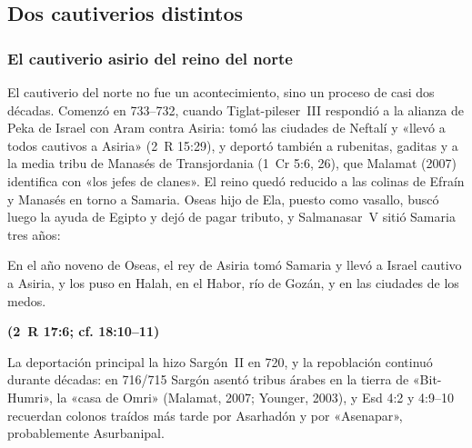 \documentclass[11pt,letterpaper]{article}
\newcommand{\fuente}[1]{\par\hfill{\upshape\bfseries\small\textcolor{ladrillo}{#1}}}
\begin{document}
\subsection{Dos cautiverios distintos}\label{sec:doscautiverios}

\subsubsection*{El cautiverio asirio del reino del norte}
El cautiverio del norte no fue un acontecimiento, sino un proceso de casi dos décadas. Comenzó en 733--732, cuando Tiglat-pileser~III respondió a la alianza de Peka de Israel con Aram contra Asiria: tomó las ciudades de Neftalí y «llevó a todos cautivos a Asiria» (2~R 15:29), y deportó también a rubenitas, gaditas y a la media tribu de Manasés de Transjordania (1~Cr 5:6, 26), que Malamat (2007) identifica con «los jefes de clanes». El reino quedó reducido a las colinas de Efraín y Manasés en torno a Samaria. Oseas hijo de Ela, puesto como vasallo, buscó luego la ayuda de Egipto y dejó de pagar tributo, y Salmanasar~V sitió Samaria tres años:
\begin{cita}En el año noveno de Oseas, el rey de Asiria tomó Samaria y llevó a Israel cautivo a Asiria, y los puso en Halah, en el Habor, río de Gozán, y en las ciudades de los medos.\fuente{(2~R 17:6; cf. 18:10--11)}\end{cita}
La deportación principal la hizo Sargón~II en 720, y la repoblación continuó durante décadas: en 716/715 Sargón asentó tribus árabes en la tierra de «Bit-Humri», la «casa de Omri» (Malamat, 2007; Younger, 2003), y Esd 4:2 y 4:9--10 recuerdan colonos traídos más tarde por Asarhadón y por «Asenapar», probablemente Asurbanipal.
\end{document}
